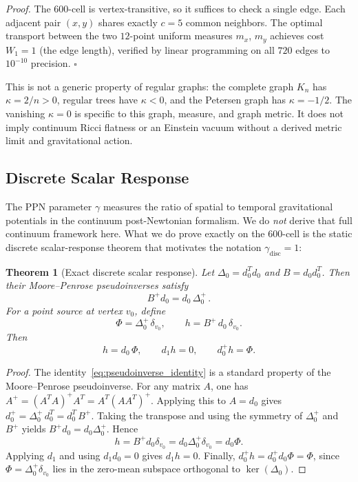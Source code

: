 \documentclass[12pt,a4paper]{article}
\newtheorem{theorem}{Theorem}
\theoremstyle{definition}
\begin{document}
\noindent\textit{Proof.}  The 600-cell is vertex-transitive, so it suffices to check a single edge.  Each adjacent pair $(x,y)$ shares exactly $c = 5$ common neighbors.  The optimal transport between the two $12$-point uniform measures $m_x$, $m_y$ achieves cost $W_1 = 1$ (the edge length), verified by linear programming on all $720$ edges to $10^{-10}$ precision.  \hfill$\square$

This is not a generic property of regular graphs: the complete graph $K_n$ has $\kappa = 2/n > 0$, regular trees have $\kappa < 0$, and the Petersen graph has $\kappa = -1/2$.  The vanishing $\kappa=0$ is specific to this graph, measure, and graph metric.  It does not imply continuum Ricci flatness or an Einstein vacuum without a derived metric limit and gravitational action.

\subsection{Discrete Scalar Response}

The PPN parameter $\gamma$ measures the ratio of spatial to temporal
gravitational potentials in the continuum post-Newtonian formalism.  We do
\emph{not} derive that full continuum framework here.  What we do prove exactly
on the 600-cell is the static discrete scalar-response theorem that motivates
the notation $\gamma_{\mathrm{disc}} = 1$:

\begin{theorem}[Exact discrete scalar response]
\label{thm:discrete_scalar_response}
Let $\Delta_0 = d_0^T d_0$ and $B = d_0 d_0^T$.  Then their Moore--Penrose
pseudoinverses satisfy
\begin{equation}
\boxed{B^+ d_0 = d_0\,\Delta_0^+}\,.
\label{eq:pseudoinverse_identity}
\end{equation}
For a point source at vertex $v_0$, define
\begin{equation}
\Phi = \Delta_0^+\,\delta_{v_0},
\qquad
h = B^+\,d_0\,\delta_{v_0}.
\end{equation}
Then
\begin{equation}
h = d_0\,\Phi,
\qquad
d_1 h = 0,
\qquad
d_0^+ h = \Phi.
\label{eq:discrete_scalar_response}
\end{equation}
\end{theorem}

\begin{proof}
The identity~\eqref{eq:pseudoinverse_identity} is a standard property of the
Moore--Penrose pseudoinverse.  For any matrix $A$, one has
$A^+ = (A^T\!A)^+ A^T = A^T (AA^T)^+$.  Applying this to $A = d_0$ gives
$d_0^+ = \Delta_0^+\,d_0^T = d_0^T\,B^+$.  Taking the transpose and using the
symmetry of $\Delta_0^+$ and $B^+$ yields
$B^+ d_0 = d_0 \Delta_0^+$.
Hence
\begin{equation}
h = B^+ d_0 \delta_{v_0} = d_0 \Delta_0^+ \delta_{v_0} = d_0 \Phi.
\end{equation}
Applying $d_1$ and using $d_1 d_0 = 0$ gives $d_1 h = 0$.  Finally,
$d_0^+ h = d_0^+ d_0 \Phi = \Phi$, since $\Phi = \Delta_0^+ \delta_{v_0}$
lies in the zero-mean subspace orthogonal to $\ker(\Delta_0)$.
\end{proof}
\end{document}
